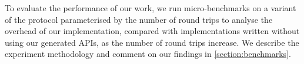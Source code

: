 To evaluate the performance of our work,
we run micro-benchmarks
on a variant of the 
protocol parameterised by the number
of round trips
to analyse the overhead of our implementation,
compared with implementations written
without using our generated APIs,
as the number of round trips increase.
We describe the experiment methodology
and comment on our findings in \cref{section:benchmarks}.





 

